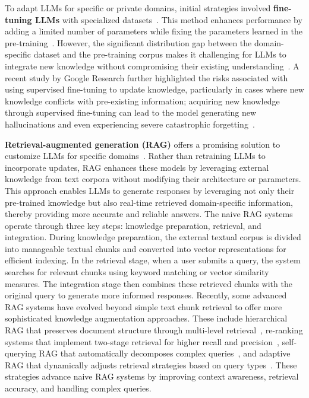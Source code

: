 \documentclass[lettersize,journal]{IEEEtran}
\begin{document}
To adapt LLMs for specific or private domains, initial strategies involved {\bf fine-tuning LLMs} with specialized datasets~\cite{hu2022lora}. This method enhances performance by adding a limited number of parameters while fixing the parameters learned in the pre-training~\cite{he2022towards}. However, the significant distribution gap between the domain-specific dataset and the pre-training corpus makes it challenging for LLMs to integrate new knowledge without compromising their existing understanding~\cite{gekhman2024does}. A recent study by Google Research further highlighted the risks associated with using supervised fine-tuning to update knowledge, particularly in cases where new knowledge conflicts with pre-existing information; acquiring new knowledge through supervised fine-tuning can lead to the model generating new hallucinations and even experiencing severe catastrophic forgetting~\cite{zhai2024investigating}.

\textbf{Retrieval-augmented generation (RAG)} offers a promising solution to customize LLMs for specific domains~\cite{lewis2020retrieval,zhang2025faithfulrag}. Rather than retraining LLMs to incorporate updates, RAG enhances these models by leveraging external knowledge from text corpora without modifying their architecture or parameters.  This approach enables LLMs to generate responses by leveraging not only their pre-trained knowledge but also real-time retrieved domain-specific information, thereby providing more accurate and reliable answers. The naive RAG systems operate through three key steps: knowledge preparation, retrieval, and integration. During knowledge preparation, the external textual corpus is divided into manageable textual chunks and converted into vector representations for efficient indexing. In the retrieval stage, when a user submits a query, the system searches for relevant chunks using keyword matching or vector similarity measures. The integration stage then combines these retrieved chunks with the original query to generate more informed responses. Recently, some advanced RAG systems have evolved beyond simple text chunk retrieval to offer more sophisticated knowledge augmentation approaches. These include hierarchical RAG that preserves document structure through multi-level retrieval~\cite{chen2024multi,li2024structrag}, re-ranking systems that implement two-stage retrieval for higher recall and precision~\cite{glass2022re2g,xu2023recomp}, self-querying RAG that automatically decomposes complex queries~\cite{asai2023self}, and adaptive RAG that dynamically adjusts retrieval strategies based on query types~\cite{tang2024mba,sarthi2024raptor}. These strategies advance naive RAG systems by improving context awareness, retrieval accuracy, and handling complex queries.
\end{document}
